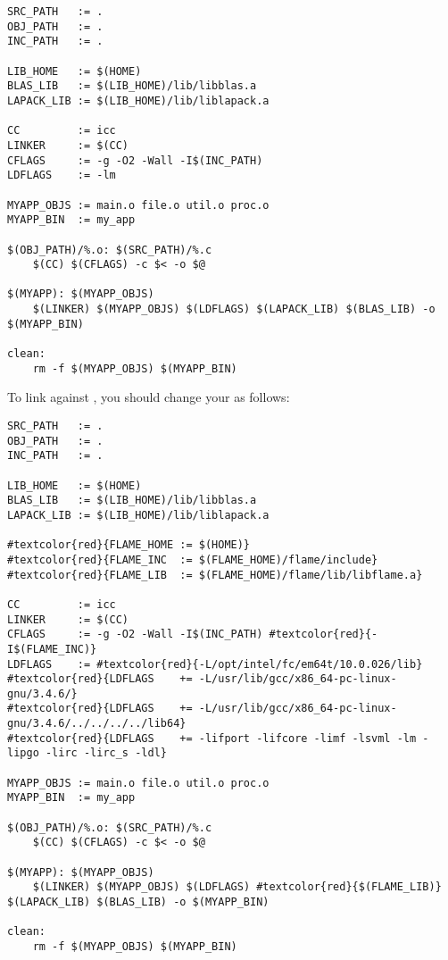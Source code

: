\begin{Verbatim}[frame=single,framesep=2.5mm,xleftmargin=5mm,commandchars=\#\{\},fontsize=\footnotesize]
SRC_PATH   := .
OBJ_PATH   := .
INC_PATH   := .

LIB_HOME   := $(HOME)
BLAS_LIB   := $(LIB_HOME)/lib/libblas.a
LAPACK_LIB := $(LIB_HOME)/lib/liblapack.a

CC         := icc
LINKER     := $(CC)
CFLAGS     := -g -O2 -Wall -I$(INC_PATH)
LDFLAGS    := -lm 

MYAPP_OBJS := main.o file.o util.o proc.o
MYAPP_BIN  := my_app

$(OBJ_PATH)/%.o: $(SRC_PATH)/%.c
    $(CC) $(CFLAGS) -c $< -o $@

$(MYAPP): $(MYAPP_OBJS)
    $(LINKER) $(MYAPP_OBJS) $(LDFLAGS) $(LAPACK_LIB) $(BLAS_LIB) -o $(MYAPP_BIN)

clean:
    rm -f $(MYAPP_OBJS) $(MYAPP_BIN)
\end{Verbatim}

\noindent
To link against \libflame, you should change your \makefile as follows:

\begin{Verbatim}[frame=single,framesep=2.5mm,xleftmargin=5mm,commandchars=\#\{\},fontsize=\footnotesize]
SRC_PATH   := .
OBJ_PATH   := .
INC_PATH   := .

LIB_HOME   := $(HOME)
BLAS_LIB   := $(LIB_HOME)/lib/libblas.a
LAPACK_LIB := $(LIB_HOME)/lib/liblapack.a

#textcolor{red}{FLAME_HOME := $(HOME)}
#textcolor{red}{FLAME_INC  := $(FLAME_HOME)/flame/include}
#textcolor{red}{FLAME_LIB  := $(FLAME_HOME)/flame/lib/libflame.a}

CC         := icc
LINKER     := $(CC)
CFLAGS     := -g -O2 -Wall -I$(INC_PATH) #textcolor{red}{-I$(FLAME_INC)}
LDFLAGS    := #textcolor{red}{-L/opt/intel/fc/em64t/10.0.026/lib}
#textcolor{red}{LDFLAGS    += -L/usr/lib/gcc/x86_64-pc-linux-gnu/3.4.6/}
#textcolor{red}{LDFLAGS    += -L/usr/lib/gcc/x86_64-pc-linux-gnu/3.4.6/../../../../lib64}
#textcolor{red}{LDFLAGS    += -lifport -lifcore -limf -lsvml -lm -lipgo -lirc -lirc_s -ldl}

MYAPP_OBJS := main.o file.o util.o proc.o
MYAPP_BIN  := my_app

$(OBJ_PATH)/%.o: $(SRC_PATH)/%.c
    $(CC) $(CFLAGS) -c $< -o $@

$(MYAPP): $(MYAPP_OBJS)
    $(LINKER) $(MYAPP_OBJS) $(LDFLAGS) #textcolor{red}{$(FLAME_LIB)} $(LAPACK_LIB) $(BLAS_LIB) -o $(MYAPP_BIN)

clean:
    rm -f $(MYAPP_OBJS) $(MYAPP_BIN)
\end{Verbatim}

